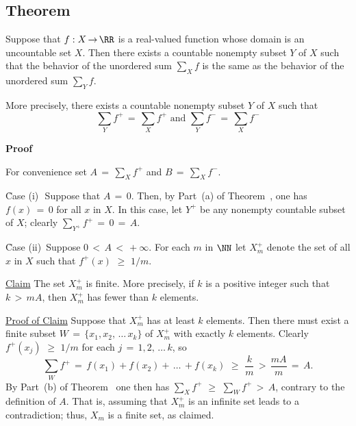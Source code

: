 \V
\V

            \subsection{\small{\bf Theorem}}
            \label{ThmG20.100}

        Suppose that $f:X \,{\rightarrow}\, {\RR}$ is a real-valued function whose domain is an uncountable set $X$.
    Then there exists a countable nonempty subset $Y$ of $X$ such that the behavior of the unordered sum ${\sum}_{X} f$ is the same as the behavior of the unordered sum ${\sum}_{Y} f$.

        More precisely, there exists a countable nonempty subset $Y$ of $X$ such that
        \begin{displaymath}
        {\sum}_{Y} f^{+} \,=\, {\sum}_{X} f^{+} \mbox{ and }
        {\sum}_{Y} f^{-} \,=\, {\sum}_{X} f^{-}
        \end{displaymath}

\V

        {\bf Proof}

\V

        For convenience set $A \,=\, {\sum}_{X} f^{+}$ and $B \,=\, {\sum}_{X} f^{-}$.

        \h Case (i)\,\, Suppose that $A \,=\, 0$. Then, by Part~(a) of Theorem~, one has $f(x) \,=\, 0$ for all $x$ in $X$.
    In this case, let $Y^{+}$ be any nonempty countable subset of $X$; clearly ${\sum}_{Y^{+}} f^{+} \,=\, 0 \,=\, A$.

        \h Case (ii)\, Suppose $0\,<\,A\,<\,+{\infty}$.
    For each $m$ in ${\NN}$ let $X^{+}_{m}$ denote the set of all $x$ in $X$ such that $f^{+}(x)\,\,{\geq}\,\,1/m$.

        \underline{Claim} The set $X^{+}_{m}$ is finite. More precisely, if $k$ is a positive integer such that $k\,>\,mA$, then $X^{+}_{m}$ has fewer than $k$ elements.

        \underline{Proof of Claim} Suppose that $X^{+}_{m}$ has at least $k$ elements.
    Then there must exist a finite subset $W \,=\, \{x_{1},x_{2},\,{\ldots}\,x_{k}\}$ of $X^{+}_{m}$ with exactly $k$ elements.
    Clearly $f^{+}(x_{j})\,\,{\geq}\,\,1/m$ for each $j \,=\, 1,2,\,{\ldots}\,k$, so
        \begin{displaymath}
        {\sum}_{W} f^{+} \,=\, f(x_{1}) + f(x_{2}) + \,{\ldots}\,+ f(x_{k})\,\,{\geq}\,\, \frac{k}{m}\,>\,\frac{mA}{m} \,=\, A.
        \end{displaymath}
    By Part~(b) of Theorem~ one then has ${\sum}_{X} f^{+}\,\,{\geq}\,\,{\sum}_{W} f^{+}\,>\,A$, contrary to the definition of $A$.
    That is, assuming that $X^{+}_{m}$ is an infinite set leads to a contradiction; thus, $X_{m}$ is a finite set, as claimed.

